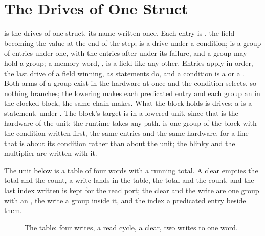 \section{The Drives of One Struct}
\label{sec:x-with}

 is the drives of one struct, its name
written once. Each entry is , the field becoming
the value at the end of the step;  is a drive
under a condition;  is a group of
entries under one, with the entries after  under its
failure, and a group may hold a group; a memory word, ,
is a field like any other. Entries apply in order, the last drive of
a field winning, as statements do, and a condition is a 
or a . Both arms of a group exist in the hardware at once
and the condition selects, so nothing branches; the lowering makes
each predicated entry and each group an  in the clocked
block, the same chain  makes. What the block holds is
drives: a  is a statement, under . The block's
target is  in a lowered unit, since that is the hardware
of the unit; the runtime takes any path.
 is one group of the
block with the condition written first, the same entries and the
same hardware, for a line that is about its condition rather than
about the unit; the blinky and the multiplier are written with it.

The unit below is a table of four words with a running total. A
clear empties the total and the count, a write lands in the table,
the total and the count, and the last index written is kept for the
read port; the clear and the write are one group with an
, the write a group inside it, and the index a predicated
entry beside them.

\begin{figure}[htbp]
\centering

\caption{The table: four writes, a read cycle, a clear, two writes to one word.}
\label{fig:x-with}
\end{figure}




